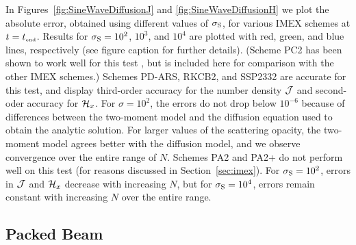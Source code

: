 In Figures~\ref{fig:SineWaveDiffusionJ} and \ref{fig:SineWaveDiffusionH} we plot the absolute error, obtained using different values of $\sigma_{{\rm S}}$, for various IMEX schemes at $t=t_{\mbox{\tiny end}}$.  
Results for $\sigma_{{\rm S}}=10^{2}$, $10^{3}$, and $10^{4}$ are plotted with red, green, and blue lines, respectively (see figure caption for further details).  
(Scheme PC2 has been shown to work well for this test \cite{radice_etal_2013}, but is included here for comparison with the other IMEX schemes.)
Schemes PD-ARS, RKCB2, and SSP2332 are accurate for this test, and display third-order accuracy for the number density $\mathcal{J}$ and second-oder accuracy for $\mathcal{H}_{x}$.  
For $\sigma=10^{2}$, the errors do not drop below $10^{-6}$ because of differences between the two-moment model and the diffusion equation used to obtain the analytic solution.  
For larger values of the scattering opacity, the two-moment model agrees better with the diffusion model, and we observe convergence over the entire range of $N$.  
Schemes PA2 and PA2+ do not perform well on this test (for reasons discussed in Section~\ref{sec:imex}).  
For $\sigma_{{\rm S}}=10^{2}$, errors in $\mathcal{J}$ and $\mathcal{H}_{x}$ decrease with increasing $N$, but for $\sigma_{{\rm S}}=10^{4}$, errors remain constant with increasing $N$ over the entire range.  

\subsection{Packed Beam}
\label{sec:packedBeam}

